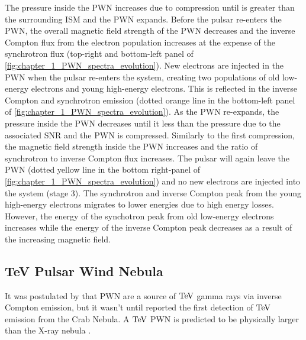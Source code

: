 \newpar
The pressure inside the PWN increases due to compression until is greater than the surrounding ISM and the PWN expands. Before the pulsar re-enters the PWN, the overall magnetic field strength of the PWN decreases and the inverse Compton flux from the electron population increases at the expense of the synchrotron flux (top-right and bottom-left panel of \autoref{fig:chapter_1_PWN_spectra_evolution}). New electrons are injected in the PWN when the pulsar re-enters the system, creating two populations of old low-energy electrons and young high-energy electrons. This is reflected in the inverse Compton and synchrotron emission (dotted orange line in the bottom-left panel of \autoref{fig:chapter_1_PWN_spectra_evolution}).
\newpar
As the PWN re-expands, the pressure inside the PWN decreases until it less than the pressure due to the associated SNR and the PWN is compressed. Similarly to the first compression, the magnetic field strength inside the PWN increases and the ratio of synchrotron to inverse Compton flux increases. The pulsar will again leave the PWN (dotted yellow line in the bottom right-panel of \autoref{fig:chapter_1_PWN_spectra_evolution}) and no new electrons are injected into the system (stage 3). The synchrotron and inverse Compton peak from the young high-energy electrons migrates to lower energies due to high energy losses. However, the energy of the synchotron peak from old low-energy electrons increases while the energy of the inverse Compton peak decreases as a result of the increasing magnetic field.

\subsection{TeV Pulsar Wind Nebula} \label{sec:01_PWN_TeVPWN}

It was postulated by \cite{1965PhRvL..15..577G} that PWN are a source of $\TeV$ gamma rays via inverse Compton emission, but it wasn't until \cite{1989ApJ...342..379W} reported the first detection of $\TeV$ emission from the Crab Nebula. A $\TeV$ PWN is predicted to be physically larger than the X-ray nebula \citep{1997MNRAS.291..162A}.

